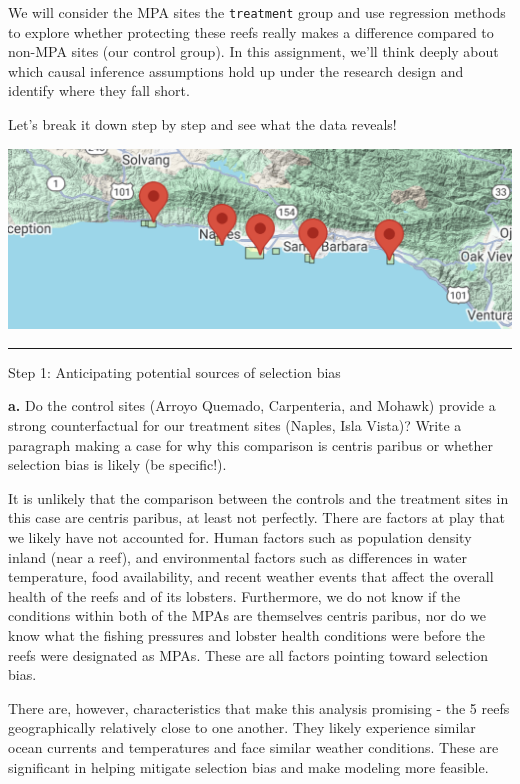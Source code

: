 \documentclass[
]{article}
\begin{document}
We will consider the MPA sites the \texttt{treatment} group and use
regression methods to explore whether protecting these reefs really
makes a difference compared to non-MPA sites (our control group). In
this assignment, we'll think deeply about which causal inference
assumptions hold up under the research design and identify where they
fall short.

Let's break it down step by step and see what the data reveals!

\includegraphics{figures/map-5reefs.png}

\begin{center}\rule{0.5\linewidth}{0.5pt}\end{center}

Step 1: Anticipating potential sources of selection bias

\textbf{a.} Do the control sites (Arroyo Quemado, Carpenteria, and
Mohawk) provide a strong counterfactual for our treatment sites (Naples,
Isla Vista)? Write a paragraph making a case for why this comparison is
centris paribus or whether selection bias is likely (be specific!).

It is unlikely that the comparison between the controls and the
treatment sites in this case are centris paribus, at least not
perfectly. There are factors at play that we likely have not accounted
for. Human factors such as population density inland (near a reef), and
environmental factors such as differences in water temperature, food
availability, and recent weather events that affect the overall health
of the reefs and of its lobsters. Furthermore, we do not know if the
conditions within both of the MPAs are themselves centris paribus, nor
do we know what the fishing pressures and lobster health conditions were
before the reefs were designated as MPAs. These are all factors pointing
toward selection bias.

There are, however, characteristics that make this analysis promising -
the 5 reefs geographically relatively close to one another. They likely
experience similar ocean currents and temperatures and face similar
weather conditions. These are significant in helping mitigate selection
bias and make modeling more feasible.
\end{document}
